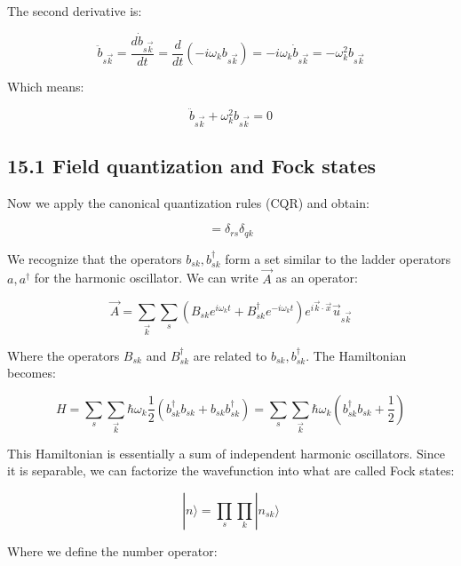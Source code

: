 \documentclass[10pt]{article}
\begin{document}
The second derivative is:

\begin{equation*}
\ddot{b}_{s\vec{k}}=\frac{d\dot{b}_{s\vec{k}}}{dt}=\frac{d}{dt}(-i\omega_kb_{s\vec{k}})=-i\omega_k\dot{b}_{s\vec{k}}=-\omega_k^2b_{s\vec{k}} \tag{15.16}
\end{equation*}

Which means:

\begin{equation*}
\ddot{b}_{s\vec{k}}+\omega_k^2b_{s\vec{k}}=0 \tag{15.17}
\end{equation*}

\subsection*{15.1 Field quantization and Fock states}
Now we apply the canonical quantization rules (CQR) and obtain:

\begin{equation*}
[b_{sk},b_{rq}^\dagger]=\delta_{rs}\delta_{qk} \tag{15.18}
\end{equation*}

We recognize that the operators $b_{sk}, b_{sk}^\dagger$ form a set similar to the ladder operators $a, a^\dagger$ for the harmonic oscillator. We can write $\vec{A}$ as an operator:

\begin{equation*}
\vec{A}=\sum_{\vec{k}}\sum_s(B_{sk}e^{i\omega_k t}+B_{sk}^\dagger e^{-i\omega_k t})e^{i\vec{k}\cdot\vec{x}}\vec{u}_{s\vec{k}} \tag{15.19}
\end{equation*}

Where the operators $B_{sk}$ and $B_{sk}^\dagger$ are related to $b_{sk}, b_{sk}^\dagger$. The Hamiltonian becomes:

\begin{equation*}
H=\sum_s\sum_{\vec{k}}\hbar\omega_k\frac{1}{2}(b_{sk}^\dagger b_{sk}+b_{sk}b_{sk}^\dagger)=\sum_s\sum_{\vec{k}}\hbar\omega_k(b_{sk}^\dagger b_{sk}+\frac{1}{2}) \tag{15.20}
\end{equation*}


This Hamiltonian is essentially a sum of independent harmonic oscillators. Since it is separable, we can factorize the wavefunction into what are called Fock states:

\begin{equation*}
|n\rangle=\prod_s\prod_k|n_{sk}\rangle \tag{15.21}
\end{equation*}

Where we define the number operator:
\end{document}
